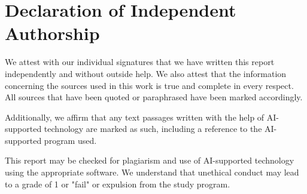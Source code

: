 \section*{Declaration of Independent Authorship}
We attest with our individual signatures that we have written this report independently and without outside help. We also attest that the information concerning the sources used in this work is true and complete in every respect. All sources that have been quoted or paraphrased have been marked accordingly. 

Additionally, we affirm that any text passages written with the help of AI-supported technology are marked as such, including a reference to the AI-supported program used. 

This report may be checked for plagiarism and use of AI-supported technology using the appropriate software. We understand that unethical conduct may lead to a grade of 1 or "fail" or expulsion from the study program. 

